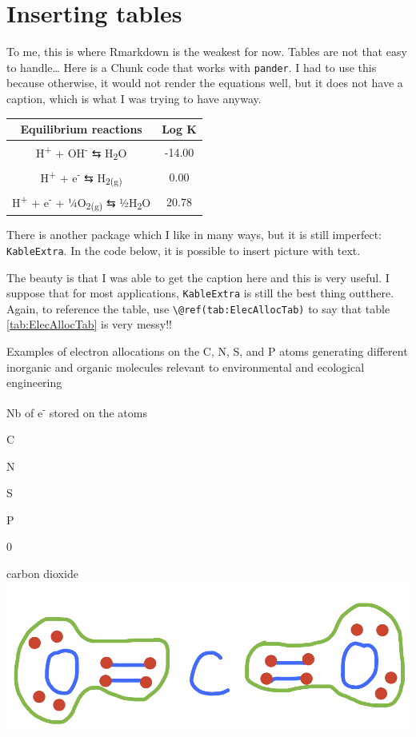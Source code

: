 \documentclass[]{book}
\theoremstyle{definition}
\theoremstyle{definition}
\theoremstyle{definition}
\theoremstyle{remark}
\begin{document}
\section{Inserting tables}\label{inserting-tables}

To me, this is where Rmarkdown is the weakest for now. Tables are not
that easy to handle\ldots{} Here is a Chunk code that works with
\texttt{pander}. I had to use this because otherwise, it would not
render the equations well, but it does not have a caption, which is what
I was trying to have anyway.

\begin{longtable}[]{@{}cc@{}}
\toprule
Equilibrium reactions & Log K\tabularnewline
\midrule
\endhead
H\textsuperscript{+} + OH\textsuperscript{-} ⇆ H\textsubscript{2}O &
-14.00\tabularnewline
H\textsuperscript{+} + e\textsuperscript{-} ⇆ H\textsubscript{2(g)} &
0.00\tabularnewline
H\textsuperscript{+} + e\textsuperscript{-} + ¼O\textsubscript{2(g)} ⇆
½H\textsubscript{2}O & 20.78\tabularnewline
\bottomrule
\end{longtable}

There is another package which I like in many ways, but it is still
imperfect: \texttt{KableExtra}. In the code below, it is possible to
insert picture with text.

The beauty is that I was able to get the caption here and this is very
useful. I suppose that for most applications, \texttt{KableExtra} is
still the best thing outthere. Again, to reference the table, use
\texttt{\textbackslash{}@ref(tab:ElecAllocTab)} to say that table
\ref{tab:ElecAllocTab} is very messy!!

\label{tab:ElecAllocTab}Examples of electron allocations on the C, N, S, and
P atoms generating different inorganic and organic molecules relevant to
environmental and ecological engineering

Nb of e\textsuperscript{-} stored on the atoms

C

N

S

P

0

carbon dioxide~\includegraphics{pictures/ElecAlloc_CO2.png}
\end{document}
